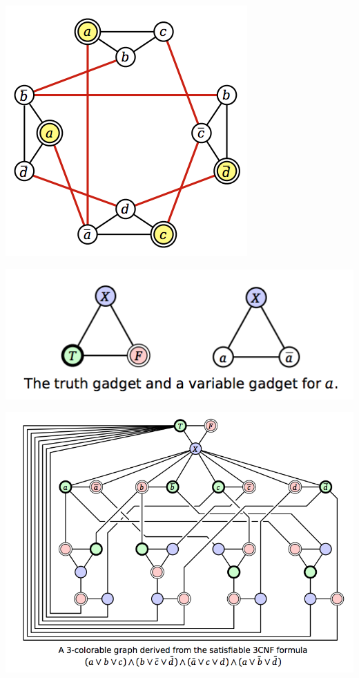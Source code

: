 \includegraphics[width=\linewidth]{images/hamcycle.png}

\includegraphics[width=\linewidth]{images/truthgadget.png}

\includegraphics[width=\linewidth]{images/3color.png}


